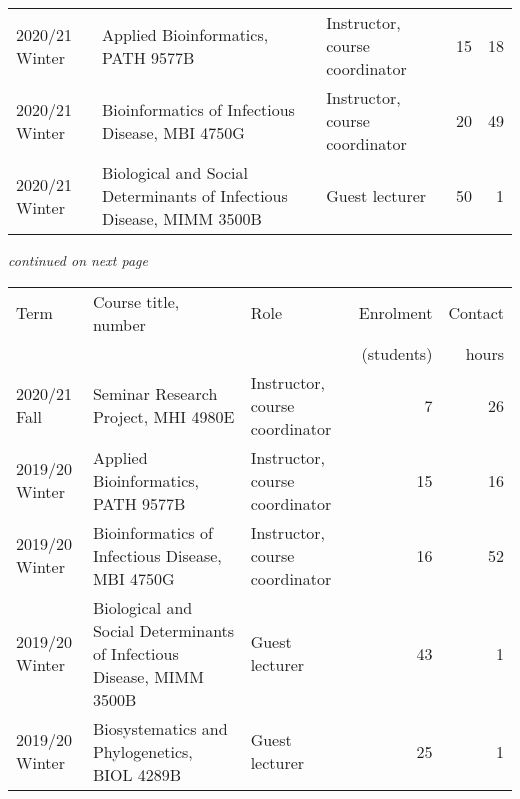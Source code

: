\begin{tabular}{lp{2.35in}p{1.2in}rr}
2020/21 Winter & Applied Bioinformatics, PATH 9577B & Instructor, course coordinator & 15 & 18\\
2020/21 Winter & Bioinformatics of Infectious Disease, MBI 4750G & Instructor, course coordinator & 20 & 49\\
2020/21 Winter & Biological and Social Determinants of Infectious Disease, MIMM 3500B & Guest lecturer & 50 & 1\\

\hline

\end{tabular}
\egroup

\textit{continued on next page}


\bgroup
\setlength{\tabcolsep}{6pt}
\def\arraystretch{1.3}%
\begin{tabular}{lp{2.35in}p{1.2in}rr}
Term & Course title, number & Role & Enrolment & Contact\\[-3pt]
  &  &  &  (students) & hours \\
  
\hline


2020/21 Fall & Seminar Research Project, MHI 4980E & Instructor, course coordinator & 7 & 26\\


2019/20 Winter & Applied Bioinformatics, PATH 9577B & Instructor, course coordinator & 15 & 16\\
2019/20 Winter & Bioinformatics of Infectious Disease, MBI 4750G & Instructor, course coordinator & 16 & 52\\
2019/20 Winter & Biological and Social Determinants of Infectious Disease, MIMM 3500B & Guest lecturer & 43 & 1\\
2019/20 Winter & Biosystematics and Phylogenetics, BIOL 4289B & Guest lecturer & 25 & 1\\

\hline

\end{tabular}
\egroup